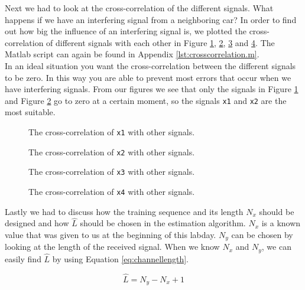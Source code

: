 \documentclass[final]{scrreprt} %
\begin{document}
Next we had to look at the cross-correlation of the different signals. 
What happens if we have an interfering signal from a neighboring car?
In order to find out how big the influence of an interfering signal is, we plotted the cross-correlation of different signals with each other in Figure \ref{fig:cross1}, \ref{fig:cross2}, \ref{fig:cross3} and \ref{fig:cross4}.
The Matlab script can again be found in Appendix \ref{lst:crosscorrelation.m}.
\\
In an ideal situation you want the cross-correlation between the different signals to be zero. 
In this way you are able to prevent most errors that occur when we have interfering signals. 
From our figures we see that only the signals in Figure \ref{fig:cross1} and Figure \ref{fig:cross2} go to zero at a certain moment, so the signals \texttt{x1} and \texttt{x2} are the most suitable.

\begin{figure}[H]
	\centering
    	\setlength\figureheight{6cm}
    	\setlength\figurewidth{10cm}
    	    	
    	\caption{The cross-correlation of \texttt{x1} with other signals.}
    	\label{fig:cross1}
\end{figure}

\begin{figure}[H]
	\centering
    	\setlength\figureheight{6cm}
    	\setlength\figurewidth{10cm}
    	    	
    	\caption{The cross-correlation of \texttt{x2} with other signals.}
    	\label{fig:cross2}
\end{figure}

\begin{figure}[H]
	\centering
    	\setlength\figureheight{6cm}
    	\setlength\figurewidth{10cm}
    	    	
    	\caption{The cross-correlation of \texttt{x3} with other signals.}
    	\label{fig:cross3}
\end{figure}

\begin{figure}[H]
	\centering
    	\setlength\figureheight{6cm}
    	\setlength\figurewidth{10cm}
    	    	
    	\caption{The cross-correlation of \texttt{x4} with other signals.}
    	\label{fig:cross4}
\end{figure}

Lastly we had to discuss how the training sequence and its length $N_x$ should be designed and how $\hat{L}$ should be chosen in the estimation algorithm.
$N_x$ is a known value that was given to us at the beginning of this labday. 
$N_y$ can be chosen by looking at the length of the received signal.
When we know $N_x$ and $N_y$, we can easily find $\hat{L}$ by using Equation \ref{eq:channellength}.

\begin{equation}
\hat{L}=N_y - N_x +1
\label{eq:channellength}
\end{equation}
\end{document}
